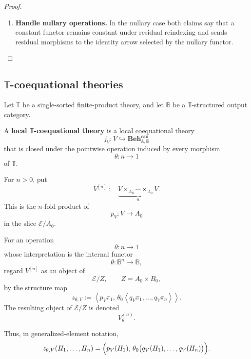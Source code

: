 \begin{proof}
\begin{enumerate}
        \item \textbf{Handle nullary operations.}
        In the nullary case both claims say that a constant functor remains
        constant under residual reindexing and sends residual morphisms to the
        identity arrow selected by the nullary functor.
    \end{enumerate}
\end{proof}

\subsection{\texorpdfstring{\(\mathbb T\)}{T}-coequational theories}
\label{subsec:T-coequational-theories}

\begin{definition}
\label{def:T-coequational-theory}
    Let \(\mathbb T\) be a single-sorted finite-product theory, and let
    \(\mathbb B\) be a \(\mathbb T\)-structured output category.

    A \textbf{local \(\mathbb T\)-coequational theory} is a local
    coequational theory
    \[
        j_V:
        V\hookrightarrow
        \mathbf{Beh}^{\mathrm{can}}_{\mathbb A,\mathbb B}
    \]
    that is closed under the pointwise operation induced by every morphism
    \[
        \theta:n\to1
    \]
    of \(\mathbb T\).

    For \(n>0\), put
    \[
        V^{[n]}
        :=
        \underbrace{
        V\times_{A_0}\cdots\times_{A_0}V
        }_{n}.
    \]
    This is the \(n\)-fold product of
    \[
        p_V:V\to A_0
    \]
    in the slice \(\mathcal E/A_0\).

    For an operation
    \[
        \theta:n\to1
    \]
    whose interpretation is the internal functor
    \[
        \theta:\mathbb B^n\to\mathbb B,
    \]
    regard \(V^{[n]}\) as an object of
    \[
        \mathcal E/Z,
        \qquad
        Z=A_0\times B_0,
    \]
    by the structure map
    \[
        z_{\theta,V}
        :=
        \left\langle
            p_V\pi_1,\,
            \theta_0
            \left\langle
                q_V\pi_1,
                \dots,
                q_V\pi_n
            \right\rangle
        \right\rangle.
    \]
    The resulting object of \(\mathcal E/Z\) is denoted
    \[
        V^{(n)}_\theta.
    \]

    Thus, in generalized-element notation,
    \[
        z_{\theta,V}(H_1,\dots,H_n)
        =
        \Bigl(
            p_V(H_1),\,
            \theta_0
            \bigl(
                q_V(H_1),
                \dots,
                q_V(H_n)
            \bigr)
        \Bigr).
    \]


\end{definition}
